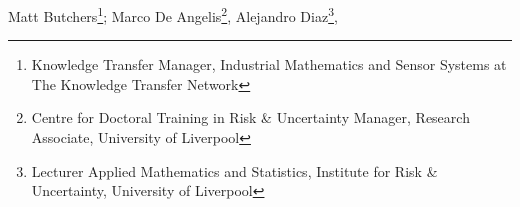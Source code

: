\documentclass[11pt]{article}%
\begin{document}
\cleardoublepage

\thispagestyle{StudyGroup}

\begin{minipage}[t]{.99\linewidth} %
\hypertarget{studyGroup}{}

\end{minipage}

Matt Butchers\footnote{Knowledge Transfer Manager, Industrial Mathematics and Sensor Systems at The Knowledge Transfer Network}; Marco De Angelis\footnote{Centre for Doctoral Training in Risk \& Uncertainty Manager, Research Associate, University of Liverpool}, Alejandro Diaz\footnote{Lecturer Applied Mathematics and Statistics, Institute for Risk \& Uncertainty, University of Liverpool}, 
\end{document}
